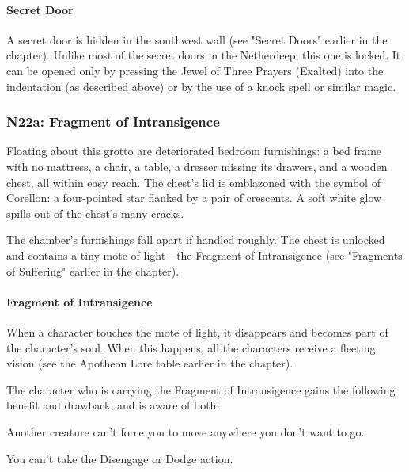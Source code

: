 \documentclass[10pt,a4paper,twoside,twocolumn,openany,nodeprecatedcode]{dndbook}
\begin{document}
\paragraph{Secret Door}
A secret door is hidden in the southwest wall (see "Secret Doors" earlier in the chapter). Unlike most of the secret doors in the Netherdeep, this one is locked. It can be opened only by pressing the Jewel of Three Prayers (Exalted) into the indentation (as described above) or by the use of a knock spell or similar magic.

\subsubsection{N22a: Fragment of Intransigence}
\begin{DndReadAloud}{}
Floating about this grotto are deteriorated bedroom furnishings: a bed frame with no mattress, a chair, a table, a dresser missing its drawers, and a wooden chest, all within easy reach. The chest's lid is emblazoned with the symbol of Corellon: a four-pointed star flanked by a pair of crescents. A soft white glow spills out of the chest's many cracks.

\end{DndReadAloud}

The chamber's furnishings fall apart if handled roughly. The chest is unlocked and contains a tiny mote of light—the Fragment of Intransigence (see "Fragments of Suffering" earlier in the chapter).

\paragraph{Fragment of Intransigence}
When a character touches the mote of light, it disappears and becomes part of the character's soul. When this happens, all the characters receive a fleeting vision (see the Apotheon Lore table earlier in the chapter).

The character who is carrying the Fragment of Intransigence gains the following benefit and drawback, and is aware of both:

\begin{DndComment}{}

\begin{description}[nolistsep]
\item[Benefit.]
Another creature can't force you to move anywhere you don't want to go.
\item[Drawback.]
You can't take the Disengage or Dodge action.
\end{description}



\end{DndComment}
\end{document}
